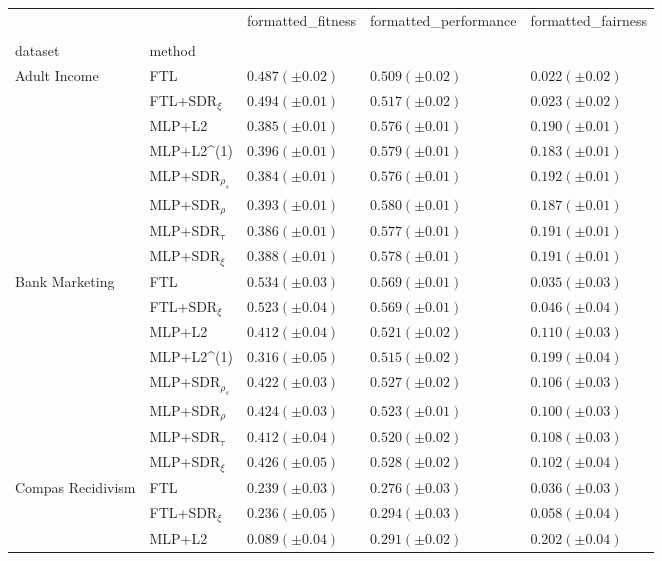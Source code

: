 \begin{tabular}{lllll}
\toprule
 &  & formatted_fitness & formatted_performance & formatted_fairness \\
 &  &  &  &  \\
dataset & method &  &  &  \\
\midrule
\multirow[t]{8}{*}{Adult Income} & FTL & $0.487 (\pm0.02)$ & $0.509 (\pm0.02)$ & $0.022 (\pm0.02)$ \\
 & FTL+SDR$_{\xi}$ & $0.494 (\pm0.01)$ & $0.517 (\pm0.02)$ & $0.023 (\pm0.02)$ \\
 & MLP+L2 & $0.385 (\pm0.01)$ & $0.576 (\pm0.01)$ & $0.190 (\pm0.01)$ \\
 & MLP+L2^{(1)} & $0.396 (\pm0.01)$ & $0.579 (\pm0.01)$ & $0.183 (\pm0.01)$ \\
 & MLP+SDR$_{\rho_s}$ & $0.384 (\pm0.01)$ & $0.576 (\pm0.01)$ & $0.192 (\pm0.01)$ \\
 & MLP+SDR$_{\rho}$ & $0.393 (\pm0.01)$ & $0.580 (\pm0.01)$ & $0.187 (\pm0.01)$ \\
 & MLP+SDR$_{\tau}$ & $0.386 (\pm0.01)$ & $0.577 (\pm0.01)$ & $0.191 (\pm0.01)$ \\
 & MLP+SDR$_{\xi}$ & $0.388 (\pm0.01)$ & $0.578 (\pm0.01)$ & $0.191 (\pm0.01)$ \\
\cline{1-5}
\multirow[t]{8}{*}{Bank Marketing} & FTL & $0.534 (\pm0.03)$ & $0.569 (\pm0.01)$ & $0.035 (\pm0.03)$ \\
 & FTL+SDR$_{\xi}$ & $0.523 (\pm0.04)$ & $0.569 (\pm0.01)$ & $0.046 (\pm0.04)$ \\
 & MLP+L2 & $0.412 (\pm0.04)$ & $0.521 (\pm0.02)$ & $0.110 (\pm0.03)$ \\
 & MLP+L2^{(1)} & $0.316 (\pm0.05)$ & $0.515 (\pm0.02)$ & $0.199 (\pm0.04)$ \\
 & MLP+SDR$_{\rho_s}$ & $0.422 (\pm0.03)$ & $0.527 (\pm0.02)$ & $0.106 (\pm0.03)$ \\
 & MLP+SDR$_{\rho}$ & $0.424 (\pm0.03)$ & $0.523 (\pm0.01)$ & $0.100 (\pm0.03)$ \\
 & MLP+SDR$_{\tau}$ & $0.412 (\pm0.04)$ & $0.520 (\pm0.02)$ & $0.108 (\pm0.03)$ \\
 & MLP+SDR$_{\xi}$ & $0.426 (\pm0.05)$ & $0.528 (\pm0.02)$ & $0.102 (\pm0.04)$ \\
\cline{1-5}
\multirow[t]{8}{*}{Compas Recidivism} & FTL & $0.239 (\pm0.03)$ & $0.276 (\pm0.03)$ & $0.036 (\pm0.03)$ \\
 & FTL+SDR$_{\xi}$ & $0.236 (\pm0.05)$ & $0.294 (\pm0.03)$ & $0.058 (\pm0.04)$ \\
 & MLP+L2 & $0.089 (\pm0.04)$ & $0.291 (\pm0.02)$ & $0.202 (\pm0.04)$ \\

\end{tabular}
